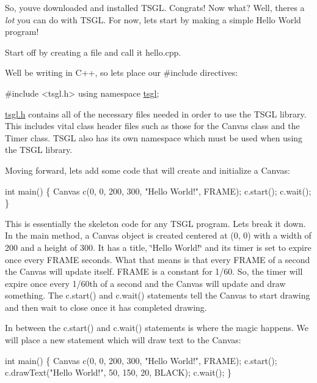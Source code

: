 So, you\textquotesingle{}ve downloaded and installed T\+S\+G\+L. Congrats! Now what? Well, there\textquotesingle{}s a {\itshape lot} you can do with T\+S\+G\+L. For now, let\textquotesingle{}s start by making a simple Hello World program!

Start off by creating a file and call it hello.\+cpp.

We\textquotesingle{}ll be writing in C++, so let\textquotesingle{}s place our \#include directives\+:


\begin{DoxyCode}
\textcolor{preprocessor}{#include <tsgl.h>}
\textcolor{keyword}{using namespace }\hyperlink{namespacetsgl}{tsgl};
\end{DoxyCode}


\hyperlink{tsgl_8h_source}{tsgl.\+h} contains all of the necessary files needed in order to use the T\+S\+G\+L library. This includes vital class header files such as those for the Canvas class and the Timer class. T\+S\+G\+L also has its own namespace which must be used when using the T\+S\+G\+L library.

Moving forward, let\textquotesingle{}s add some code that will create and initialize a Canvas\+:


\begin{DoxyCode}
\textcolor{keywordtype}{int} main() \{
  Canvas c(0, 0, 200, 300, \textcolor{stringliteral}{"Hello World!"}, FRAME);
  c.start();
  c.wait();
\}
\end{DoxyCode}


This is essentially the skeleton code for any T\+S\+G\+L program. Let\textquotesingle{}s break it down. In the main method, a Canvas object is created centered at (0, 0) with a width of 200 and a height of 300. It has a title, \char`\"{}\+Hello World!\char`\"{} and its timer is set to expire once every F\+R\+A\+M\+E seconds. What that means is that every F\+R\+A\+M\+E of a second the Canvas will update itself. F\+R\+A\+M\+E is a constant for 1/60. So, the timer will expire once every 1/60th of a second and the Canvas will update and draw something. The c.\+start() and c.\+wait() statements tell the Canvas to start drawing and then wait to close once it has completed drawing.

In between the c.\+start() and c.\+wait() statements is where the magic happens. We will place a new statement which will draw text to the Canvas\+:


\begin{DoxyCode}
\textcolor{keywordtype}{int} main() \{
  Canvas c(0, 0, 200, 300, \textcolor{stringliteral}{"Hello World!"}, FRAME);
  c.start();
  c.drawText(\textcolor{stringliteral}{"Hello World!"}, 50, 150, 20, BLACK);
  c.wait();
\}
\end{DoxyCode}


